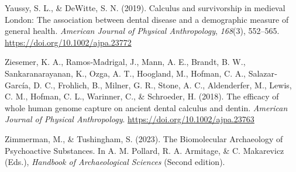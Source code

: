 \documentclass[
  letterpaper,
]{book}
\newlength{\cslhangindent}
\newlength{\cslentryspacingunit} %
\newenvironment{CSLReferences}[2] %
 {%
  \setlength{\parindent}{0pt}
  \ifodd #1
  \let\oldpar\par
  \def\par{\hangindent=\cslhangindent\oldpar}
  \fi
  \setlength{\parskip}{#2\cslentryspacingunit}
 }%
 {}
\begin{document}
\begin{CSLReferences}{1}{0}
\leavevmode{}%
Yaussy, S. L., \& DeWitte, S. N. (2019). Calculus and survivorship in
medieval {London}: {The} association between dental disease and a
demographic measure of general health. \emph{American Journal of
Physical Anthropology}, \emph{168}(3), 552--565.
\url{https://doi.org/10.1002/ajpa.23772}

\leavevmode{}%
Ziesemer, K. A., Ramos‐Madrigal, J., Mann, A. E., Brandt, B. W.,
Sankaranarayanan, K., Ozga, A. T., Hoogland, M., Hofman, C. A.,
Salazar‐García, D. C., Frohlich, B., Milner, G. R., Stone, A. C.,
Aldenderfer, M., Lewis, C. M., Hofman, C. L., Warinner, C., \&
Schroeder, H. (2018). The efficacy of whole human genome capture on
ancient dental calculus and dentin. \emph{American Journal of Physical
Anthropology}. \url{https://doi.org/10.1002/ajpa.23763}

\leavevmode{}%
Zimmerman, M., \& Tushingham, S. (2023). The {Biomolecular Archaeology}
of {Psychoactive Substances}. In A. M. Pollard, R. A. Armitage, \& C.
Makarevicz (Eds.), \emph{Handbook of {Archaeological Sciences}} (Second
edition).

\end{CSLReferences}
\end{document}
